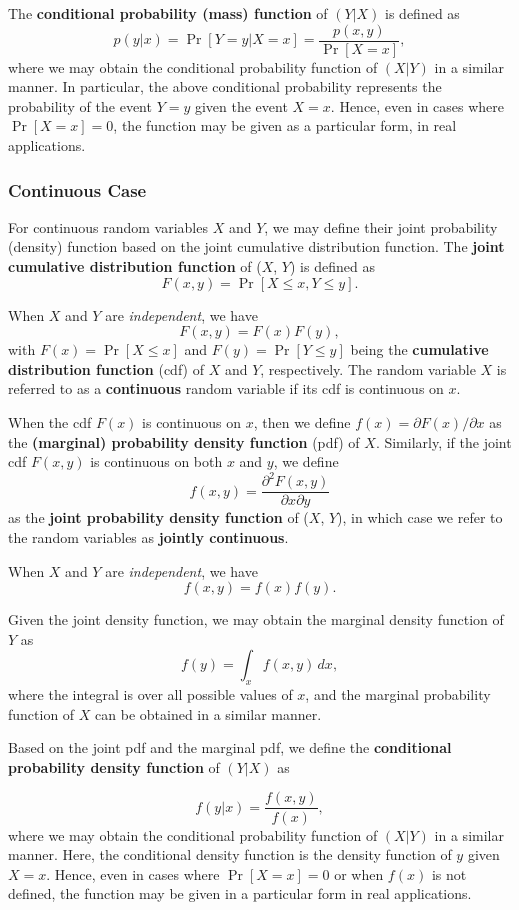 \documentclass[]{book}
\theoremstyle{definition}
\theoremstyle{definition}
\theoremstyle{definition}
\theoremstyle{remark}
\begin{document}
The \textbf{conditional probability (mass) function} of \((Y|X)\) is
defined as \[p(y|x) =\Pr[Y=y|X=x]= \frac{p(x,y)}{\Pr[X=x]},\] where we
may obtain the conditional probability function of \((X|Y)\) in a
similar manner. In particular, the above conditional probability
represents the probability of the event \(Y=y\) given the event \(X=x\).
Hence, even in cases where \(\Pr[X=x]=0\), the function may be given as
a particular form, in real applications.

\subsubsection{Continuous Case}\label{continuous-case}

For continuous random variables \(X\) and \(Y\), we may define their
joint probability (density) function based on the joint cumulative
distribution function. The \textbf{joint cumulative distribution
function} of (\(X\), \(Y\)) is defined as
\[F(x,y) = \Pr[X\leq x, Y\leq y].\]

When \(X\) and \(Y\) are \emph{independent}, we have
\[F(x,y)=F(x)F(y),\] with \(F(x)=\Pr[X\leq x]\) and
\(F(y)=\Pr[Y\leq y]\) being the \textbf{cumulative distribution
function} (cdf) of \(X\) and \(Y\), respectively. The random variable
\(X\) is referred to as a \textbf{continuous} random variable if its cdf
is continuous on \(x\).

When the cdf \(F(x)\) is continuous on \(x\), then we define
\(f(x)=\partial F(x)/\partial x\) as the \textbf{(marginal) probability
density function} (pdf) of \(X\). Similarly, if the joint cdf \(F(x,y)\)
is continuous on both \(x\) and \(y\), we define
\[f(x,y)=\frac{\partial^2 F(x,y)}{\partial x\partial y}\] as the
\textbf{joint probability density function} of (\(X\), \(Y\)), in which
case we refer to the random variables as \textbf{jointly continuous}.

When \(X\) and \(Y\) are \emph{independent}, we have
\[f(x,y)=f(x)f(y).\]

Given the joint density function, we may obtain the marginal density
function of \(Y\) as \[f(y)=\int_x f(x,y)\,dx,\] where the integral is
over all possible values of \(x\), and the marginal probability function
of \(X\) can be obtained in a similar manner.

Based on the joint pdf and the marginal pdf, we define the
\textbf{conditional probability density function} of \((Y|X)\) as

\[f(y|x) = \frac{f(x,y)}{f(x)},\] where we may obtain the conditional
probability function of \((X|Y)\) in a similar manner. Here, the
conditional density function is the density function of \(y\) given
\(X=x\). Hence, even in cases where \(\Pr[X=x]=0\) or when \(f(x)\) is
not defined, the function may be given in a particular form in real
applications.
\end{document}
